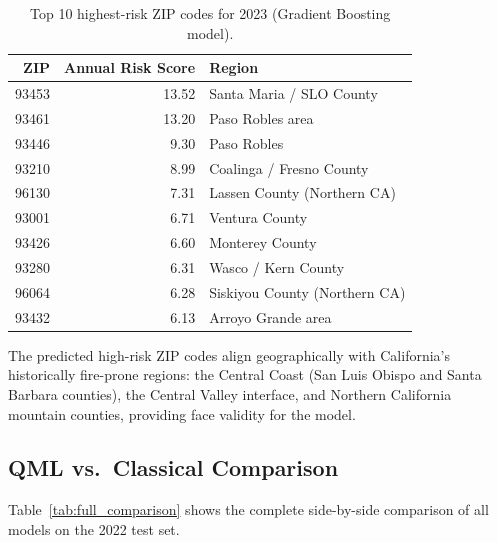 \documentclass[11pt,a4paper]{article}
\begin{document}
\begin{table}[H]
\centering
\caption{Top 10 highest-risk ZIP codes for 2023 (Gradient Boosting model).}
\begin{tabular}{rrl}
\toprule
\textbf{ZIP} & \textbf{Annual Risk Score} & \textbf{Region} \\
\midrule
93453 & 13.52 & Santa Maria / SLO County \\
93461 & 13.20 & Paso Robles area \\
93446 & 9.30  & Paso Robles \\
93210 & 8.99  & Coalinga / Fresno County \\
96130 & 7.31  & Lassen County (Northern CA) \\
93001 & 6.71  & Ventura County \\
93426 & 6.60  & Monterey County \\
93280 & 6.31  & Wasco / Kern County \\
96064 & 6.28  & Siskiyou County (Northern CA) \\
93432 & 6.13  & Arroyo Grande area \\
\bottomrule
\end{tabular}
\label{tab:top10}
\end{table}

The predicted high-risk ZIP codes align geographically with California's
historically fire-prone regions: the Central Coast (San Luis Obispo and
Santa Barbara counties), the Central Valley interface, and Northern California
mountain counties, providing face validity for the model.

\subsection{QML vs.\ Classical Comparison}
\label{sec:comparison}

Table~\ref{tab:full_comparison} shows the complete side-by-side comparison of
all models on the 2022 test set.
\end{document}
